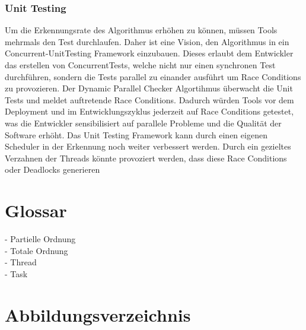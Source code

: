 \documentclass[10pt,a4paper]{article}
\begin{document}
\subsubsection*{Unit Testing}
\begin{flushleft}
Um die Erkennungsrate des Algorithmus erhöhen zu können, müssen Tools mehrmals den Test durchlaufen. Daher ist eine Vision, den Algorithmus in ein Concurrent-UnitTesting Framework einzubauen. Dieses erlaubt dem Entwickler das erstellen von ConcurrentTests, welche nicht nur einen synchronen Test durchführen, sondern die Tests parallel zu einander ausführt um Race Conditions zu provozieren. Der Dynamic Parallel Checker Algortihmus überwacht die Unit Tests und meldet auftretende Race Conditions. Dadurch würden Tools vor dem Deployment und im Entwicklungszyklus jederzeit auf Race Conditions getestet, was die Entwickler sensibilisiert auf parallele Probleme und die Qualität der Software erhöht. Das Unit Testing Framework kann durch einen eigenen Scheduler in der Erkennung noch weiter verbessert werden. Durch ein gezieltes Verzahnen der Threads könnte provoziert werden, dass diese Race Conditions oder Deadlocks generieren
\end{flushleft}
\section*{Glossar}
- Partielle Ordnung\\
- Totale Ordnung\\
- Thread\\
- Task\\
\section*{Abbildungsverzeichnis}
\makeatletter
{}
\makeatother
\end{document}
